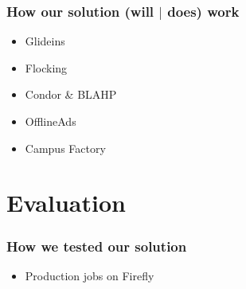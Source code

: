\documentclass[11pt]{article}
\begin{document}
\subsubsection*{How our solution (will $|$ does) work}
\begin{itemize}




\item Glideins

\item Flocking

\item Condor \& BLAHP

\item OfflineAds

\item Campus Factory

\end{itemize}


\section{Evaluation}
\label{sec:Evaluation}

\subsubsection*{How we tested our solution}
\begin{itemize}

\item Production jobs on Firefly

\end{itemize}
\end{document}
